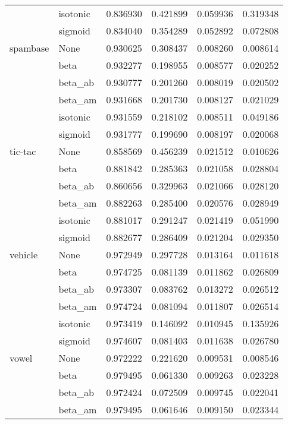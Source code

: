 \begin{tabular}{llrrrr}
        & isotonic &  0.836930 &  0.421899 &  0.059936 &  0.319348 \\
        & sigmoid &  0.834040 &  0.354289 &  0.052892 &  0.072808 \\
spambase & None &  0.930625 &  0.308437 &  0.008260 &  0.008614 \\
        & beta &  0.932277 &  0.198955 &  0.008577 &  0.020252 \\
        & beta\_ab &  0.930777 &  0.201260 &  0.008019 &  0.020502 \\
        & beta\_am &  0.931668 &  0.201730 &  0.008127 &  0.021029 \\
        & isotonic &  0.931559 &  0.218102 &  0.008511 &  0.049186 \\
        & sigmoid &  0.931777 &  0.199690 &  0.008197 &  0.020068 \\
tic-tac & None &  0.858569 &  0.456239 &  0.021512 &  0.010626 \\
        & beta &  0.881842 &  0.285363 &  0.021058 &  0.028804 \\
        & beta\_ab &  0.860656 &  0.329963 &  0.021066 &  0.028120 \\
        & beta\_am &  0.882263 &  0.285400 &  0.020576 &  0.028949 \\
        & isotonic &  0.881017 &  0.291247 &  0.021419 &  0.051990 \\
        & sigmoid &  0.882677 &  0.286409 &  0.021204 &  0.029350 \\
vehicle & None &  0.972949 &  0.297728 &  0.013164 &  0.011618 \\
        & beta &  0.974725 &  0.081139 &  0.011862 &  0.026809 \\
        & beta\_ab &  0.973307 &  0.083762 &  0.013272 &  0.026512 \\
        & beta\_am &  0.974724 &  0.081094 &  0.011807 &  0.026514 \\
        & isotonic &  0.973419 &  0.146092 &  0.010945 &  0.135926 \\
        & sigmoid &  0.974607 &  0.081403 &  0.011638 &  0.026780 \\
vowel & None &  0.972222 &  0.221620 &  0.009531 &  0.008546 \\
        & beta &  0.979495 &  0.061330 &  0.009263 &  0.023228 \\
        & beta\_ab &  0.972424 &  0.072509 &  0.009745 &  0.022041 \\
        & beta\_am &  0.979495 &  0.061646 &  0.009150 &  0.023344 \\

\end{tabular}
